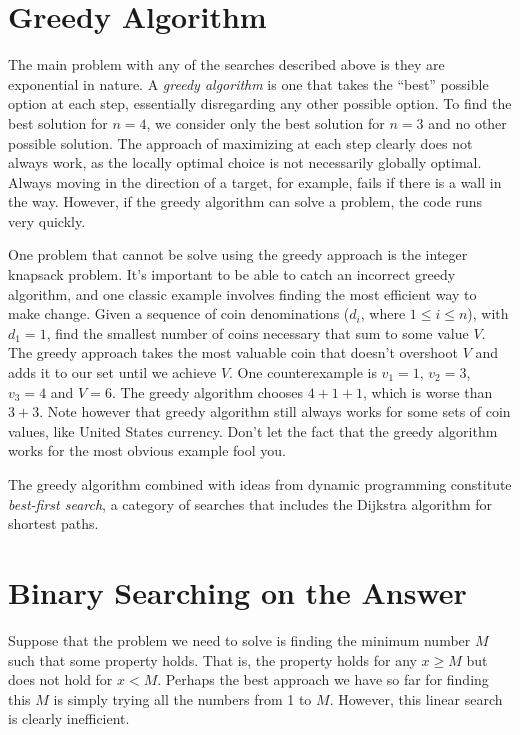 \section{Greedy Algorithm}

The main problem with any of the searches described above is they are exponential in nature. A \textit{greedy algorithm} is one that takes the ``best'' possible option at each step, essentially disregarding any other possible option. To find the best solution for $n=4$, we consider only the best solution for $n=3$ and no other possible solution. The approach of maximizing at each step clearly does not always work, as the locally optimal choice is not necessarily globally optimal. Always moving in the direction of a target, for example, fails if there is a wall in the way. However, if the greedy algorithm can solve a problem, the code runs very quickly.

One problem that cannot be solve using the greedy approach is the integer knapsack problem. It's important to be able to catch an incorrect greedy algorithm, and one classic
example involves finding the most efficient way to make change. Given a sequence of coin denominations ($d_i$, where $1 \le i \le n$), with $d_1 = 1$, find the smallest number of coins necessary that sum to some value $V$. The greedy approach takes the most valuable coin that doesn't overshoot $V$ and adds it to our set until we achieve $V$. One counterexample is $v_1=1$, $v_2=3$, $v_3=4$ and $V = 6$. The greedy algorithm chooses $4+1+1$, which is worse than $3+3$. Note however that greedy algorithm still always works for some sets of coin values, like United States currency. Don't let the fact that the greedy algorithm works for the most obvious example fool you.

The greedy algorithm combined with ideas from dynamic programming constitute \textit{best-first search}, a category of searches that includes the Dijkstra algorithm for shortest paths.

\section{Binary Searching on the Answer}

Suppose that the problem we need to solve is finding the minimum number $M$ such that some property holds. That is, the property holds for any $x \ge M$ but does not hold for $x < M$. Perhaps the best approach we have so far for finding this $M$ is simply trying all the numbers from 1 to $M$. However, this linear search is clearly inefficient.

